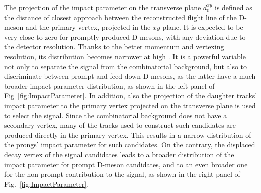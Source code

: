 The projection of the impact parameter on the transverse plane $d_0^{xy}$ is defined as the distance of closest approach between the reconstructed flight line of the D-meson and the primary vertex, projected in the $xy$ plane. It is expected to be very close to zero for promptly-produced D mesons, with any deviation due to the detector resolution. Thanks to the better momentum and vertexing resolution, its distribution becomes narrower at high \pt. It is a powerful variable not only to separate the signal from the combinatorial background, but also to discriminate between prompt and feed-down D mesons, as the latter have a much broader impact parameter distribution, as shown in the left panel of Fig~\ref{fig:ImpactParameter}. In addition, also the projection of the daughter tracks' impact parameter to the primary vertex projected on the transverse plane is used to select the signal. Since the combinatorial background does not have a secondary vertex, many of the tracks used to construct such candidates are produced directly in the primary vertex. This results in a narrow distribution of the prongs' impact parameter for such candidates. On the contrary, the displaced decay vertex of the signal candidates leads to a broader distribution of the impact parameter for prompt D-meson candidates, and to an even broader one for the non-prompt contribution to the signal, as shown in the right panel of Fig.~\ref{fig:ImpactParameter}.

